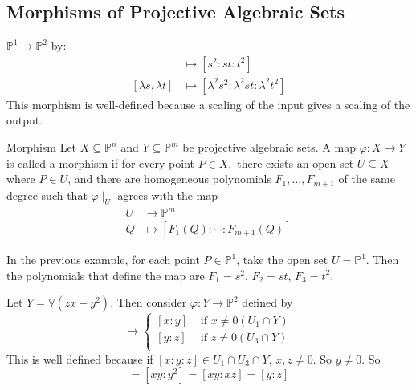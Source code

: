 \documentclass{report}
\begin{document}
\begin{topic}
    \section{Morphisms of Projective Algebraic Sets}
\end{topic}

\begin{examples}
    \begin{example}
        $\mathbb{P}^{1} \rightarrow \mathbb{P}^{2}$ by:
            \begin{align*}
                [s, t]                 &\mapsto  [s^{2}: st : t^{2}]                                  \\
                [\lambda s, \lambda t] &\mapsto  [\lambda^{2}s^{2}: \lambda^{2}st : \lambda^{2}t^{2}]   
            \end{align*}
        This morphism is well-defined because a scaling of the input gives a scaling of the output.
    \end{example}
\end{examples}

\begin{definition}{Morphism}
    Let $X \subseteq \mathbb{P}^{n}$ and $Y \subseteq \mathbb{P}^{m}$ be projective algebraic sets. A map $\varphi : X \rightarrow Y$ is called a morphism if for every point $P \in X,$ there exists an open set $U \subseteq X$ where $P \in U$, and there are homogeneous polynomials $F_{1}, \ldots, F_{m + 1}$ of the same degree such that $\varphi \mid_{U}$ agrees with the map 
        \begin{align*}
            U &\rightarrow  \mathbb{P}^{m}                     \\
            Q &\mapsto      [F_{1}(Q) : \cdots : F_{m + 1}(Q)]   
        \end{align*}
\end{definition}

In the previous example, for each point $P \in \mathbb{P}^{1}$, take the open set $U = \mathbb{P}^{1}$. Then the polynomials that define the map are $F_{1} = s^{2}$, $F_{2} = st$, $F_{3} = t^{2}$.

Let $Y = \mathbb{V}(zx - y^{2})$. Then consider $\varphi : Y \rightarrow \mathbb{P}^{2}$ defined by
    \begin{equation*}
        [x : y : z] \mapsto
             \begin{cases}
                 [x : y] &  \text{ if } x \neq 0 (U_{1} \cap Y) \\
                 [y : z] & \text{ if } z \neq 0 (U_{3} \cap Y)  \\
             \end{cases}
    \end{equation*}
This is well defined because if $[x : y : z] \in U_{1} \cap U_{3} \cap Y$, $x , z \neq 0$. So $y \neq 0$. So
    \begin{equation*}
        [x : y] = [xy : y^{2}] = [xy : xz] = [y : z]
    \end{equation*}
\end{document}
